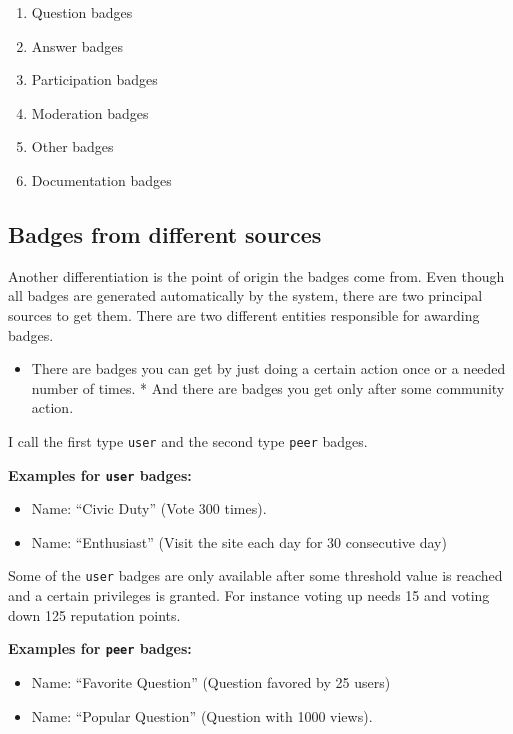 \documentclass[]{book}
\providecommand{\tightlist}{%
  \setlength{\itemsep}{0pt}\setlength{\parskip}{0pt}}
\theoremstyle{definition}
\theoremstyle{definition}
\theoremstyle{definition}
\theoremstyle{remark}
\begin{document}
\begin{enumerate}
\def\labelenumi{\arabic{enumi})}
\tightlist
\item
  Question badges
\item
  Answer badges
\item
  Participation badges
\item
  Moderation badges
\item
  Other badges
\item
  Documentation badges
\end{enumerate}

\subsection{Badges from different
sources}\label{badges-from-different-sources}

Another differentiation is the point of origin the badges come from.
Even though all badges are generated automatically by the system, there
are two principal sources to get them. There are two different entities
responsible for awarding badges.

\begin{itemize}
\tightlist
\item
  There are badges you can get by just doing a certain action once or a
  needed number of times. * And there are badges you get only after some
  community action.
\end{itemize}

I call the first type \texttt{user} and the second type \texttt{peer}
badges.

\textbf{Examples for \texttt{user} badges:}

\begin{itemize}
\tightlist
\item
  Name: ``Civic Duty'' (Vote 300 times).
\item
  Name: ``Enthusiast'' (Visit the site each day for 30 consecutive day)
\end{itemize}

Some of the \texttt{user} badges are only available after some threshold
value is reached and a certain privileges is granted. For instance
voting up needs 15 and voting down 125 reputation points.

\textbf{Examples for \texttt{peer} badges:}

\begin{itemize}
\tightlist
\item
  Name: ``Favorite Question'' (Question favored by 25 users)
\item
  Name: ``Popular Question'' (Question with 1000 views).
\end{itemize}
\end{document}
